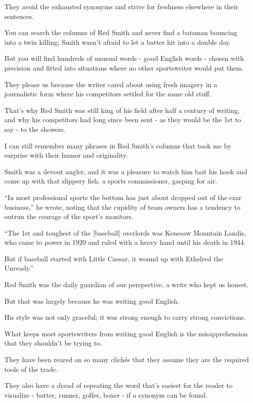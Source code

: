 \documentclass{book}
\numberwithin{equation}{section}
\begin{document}
They avoid the exhausted synonyms and strive for freshness elsewhere in their sentences.

You can search the columns of Red Smith and never find a batsman bouncing into a twin killing; Smith wasn't afraid to let a batter hit into a double day.

But you will find hundreds of unusual words - good English words - chosen with precision and fitted into situations where no other sportswriter would put them.

They please us because the writer cared about using fresh imagery in a journalistic form where his competitors settled for the same old stuff.

That's why Red Smith was still king of his field after half a century of writing, and why his competitors had long since been sent - as they would be the 1st to say - to the showers.

I can still remember many phrases in Red Smith's columns that took me by surprise with their humor and originality.

Smith was a devout angler, and it was a pleasure to watch him bait his hook and come up with that slippery fish, a sports commissioner, gasping for air.

``In most professional sports the bottom has just about dropped out of the czar business,'' he wrote, noting that the cupidity of team owners has a tendency to outrun the courage of the sport's monitors.

``The 1st and toughest of the [baseball] overlords was Kenesaw Mountain Landis, who came to power in 1920 and ruled with a heavy hand until his death in 1944.

But if baseball started with Little Caesar, it wound up with Ethelred the Unready.''

Red Smith was the daily guardian of our perspective, a write who kept us honest.

But that was largely because he was writing good English.

His style was not only graceful; it was strong enough to carry strong convictions.

%
What keeps most sportswriters from writing good English is the misapprehension that they shouldn't be trying to.

They have been reared on so many clich\'es that they assume they are the required tools of the trade.

They also have a dread of repeating the word that's easiest for the reader to visualize - batter, runner, golfer, boxer - if a synonym can be found.
\end{document}
